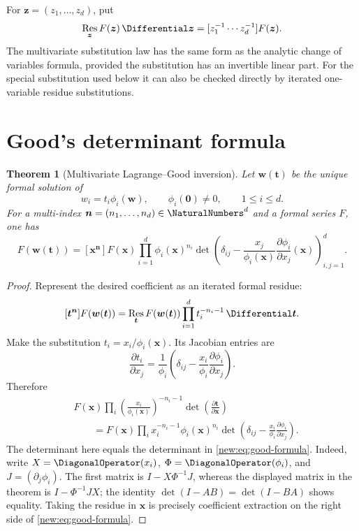\documentclass[11pt,a4paper,oneside,openany]{book}
\newtheorem{theorem}{Theorem}[chapter]
\theoremstyle{definition}
\theoremstyle{remark}
\begin{document}
For $\boldsymbol z=(z_1,\ldots,z_d)$, put
\[
 \operatorname*{Res}_{\boldsymbol z}
 F(\boldsymbol z)\,\Differential\boldsymbol z
 =[z_1^{-1}\cdots z_d^{-1}]F(\boldsymbol z).
\]
The multivariate substitution law has the same form as the analytic change of
variables formula, provided the substitution has an invertible linear part.
For the special substitution used below it can also be checked directly by
iterated one-variable residue substitutions.

\section{Good's determinant formula}

\begin{theorem}[Multivariate Lagrange--Good inversion]
Let $\boldsymbol w(\boldsymbol t)$ be the unique formal solution of
\begin{equation}
 w_i=t_i\phi_i(\boldsymbol w),\qquad
 \phi_i(\boldsymbol0)\ne0,
 \qquad 1\le i\le d.
 \label{new:eq:good-system}
\end{equation}
For a multi-index $\boldsymbol n=(n_1,\ldots,n_d)\in\NaturalNumbers^d$ and a formal series
$F$, one has
\begin{equation}
 [\boldsymbol t^{\boldsymbol n}]F(\boldsymbol w(\boldsymbol t))
 =[\boldsymbol x^{\boldsymbol n}]
 F(\boldsymbol x)\prod_{i=1}^d\phi_i(\boldsymbol x)^{n_i}
 \det\!\left(
  \delta_{ij}-\frac{x_j}{\phi_i(\boldsymbol x)}
  \frac{\partial\phi_i}{\partial x_j}(\boldsymbol x)
 \right)_{i,j=1}^d.
 \label{new:eq:good-formula}
\end{equation}
\end{theorem}

\begin{proof}
Represent the desired coefficient as an iterated formal residue:
\[
 [\boldsymbol t^{\boldsymbol n}]F(\boldsymbol w(\boldsymbol t))
 =\operatorname*{Res}_{\boldsymbol t}
 F(\boldsymbol w(\boldsymbol t))
 \prod_{i=1}^dt_i^{-n_i-1}\,\Differential\boldsymbol t.
\]
Make the substitution
$t_i=x_i/\phi_i(\boldsymbol x)$.  Its Jacobian entries are
\[
 \frac{\partial t_i}{\partial x_j}
 =\frac1{\phi_i}
 \left(\delta_{ij}-\frac{x_i}{\phi_i}
       \frac{\partial\phi_i}{\partial x_j}\right).
\]
Therefore
\begin{align*}
 &F(\boldsymbol x)
 \prod_i\left(\frac{x_i}{\phi_i(\boldsymbol x)}\right)^{-n_i-1}
 \det\left(\frac{\partial\boldsymbol t}{\partial\boldsymbol x}\right)
 \\[1mm]
 &\qquad=
 F(\boldsymbol x)\prod_i x_i^{-n_i-1}\phi_i(\boldsymbol x)^{n_i}
 \det\left(
   \delta_{ij}-\frac{x_i}{\phi_i}
   \frac{\partial\phi_i}{\partial x_j}
 \right).
\end{align*}
The determinant here equals the determinant in
\eqref{new:eq:good-formula}.  Indeed, write $X=\DiagonalOperator(x_i)$,
$\Phi=\DiagonalOperator(\phi_i)$, and $J=(\partial_j\phi_i)$.  The first matrix is
$I-X\Phi^{-1}J$, whereas the displayed matrix in the theorem is
$I-\Phi^{-1}JX$; the identity $\det(I-AB)=\det(I-BA)$ shows equality.
Taking the residue in $\boldsymbol x$ is precisely coefficient extraction on
the right side of \eqref{new:eq:good-formula}.
\end{proof}
\end{document}
